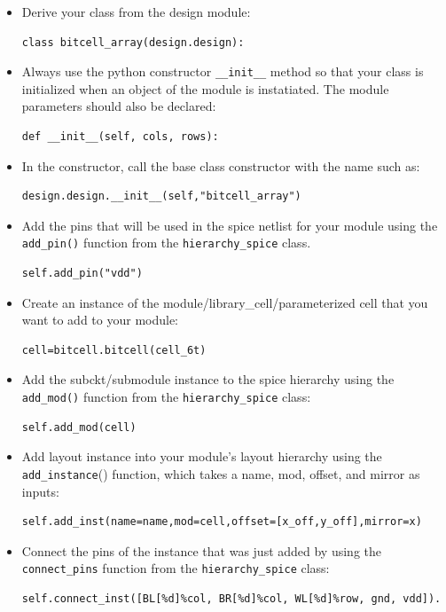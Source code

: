\begin{itemize}
\item Derive your class from the design module:
\begin{verbatim}
class bitcell_array(design.design):
\end{verbatim}
\item Always use the python constructor \verb|__init__| method so that
  your class is initialized when an object of the module is
  instatiated. The module parameters should also be declared:
\begin{verbatim}
def __init__(self, cols, rows): 
\end{verbatim}
\item In the constructor, call the base class constructor with the
  name such as:
\begin{verbatim}
design.design.__init__(self,"bitcell_array")
\end{verbatim}
\item Add the pins that will be used in the spice netlist for your
  module using the \verb|add_pin()| function from the
  \verb|hierarchy_spice| class.
\begin{verbatim}
self.add_pin("vdd")
\end{verbatim}
\item Create an instance of the module/library\_cell/parameterized
  cell that you want to add to your module:
\begin{verbatim}
cell=bitcell.bitcell(cell_6t)
\end{verbatim}
\item Add the subckt/submodule instance to the spice hierarchy using
  the \verb|add_mod()| function from the \verb|hierarchy_spice| class:
\begin{verbatim}
self.add_mod(cell)
\end{verbatim}
\item Add layout instance into your module's layout hierarchy using
  the \verb|add_instance|() function, which takes a name, mod, offset,
  and mirror as inputs:
\begin{verbatim}
self.add_inst(name=name,mod=cell,offset=[x_off,y_off],mirror=x)
\end{verbatim}
\item Connect the pins of the instance that was just added by using
  the \verb|connect_pins| function from the \verb|hierarchy_spice|
  class:
\begin{verbatim}
self.connect_inst([BL[%d]%col, BR[%d]%col, WL[%d]%row, gnd, vdd]).  
\end{verbatim}	

\end{itemize}
